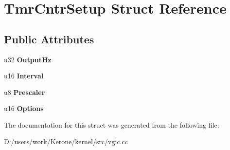 \section{Tmr\+Cntr\+Setup Struct Reference}
\label{struct_tmr_cntr_setup}
\subsection*{Public Attributes}
\begin{DoxyCompactItemize}
\item 
\mbox{\label{struct_tmr_cntr_setup_ac5645572c486f2d73aa83435f33e0d39}} 
u32 {\bfseries Output\+Hz}
\item 
\mbox{\label{struct_tmr_cntr_setup_a29b8adae4dfa298b480714f2eac9fe7a}} 
u16 {\bfseries Interval}
\item 
\mbox{\label{struct_tmr_cntr_setup_aac7f5a23f51859871f1550cf37a1d0fc}} 
u8 {\bfseries Prescaler}
\item 
\mbox{\label{struct_tmr_cntr_setup_a9addfa498965797c22ddc96b1bd14d03}} 
u16 {\bfseries Options}
\end{DoxyCompactItemize}


The documentation for this struct was generated from the following file\+:\begin{DoxyCompactItemize}
\item 
D\+:/users/work/\+Kerone/kernel/src/vgic.\+cc\end{DoxyCompactItemize}
